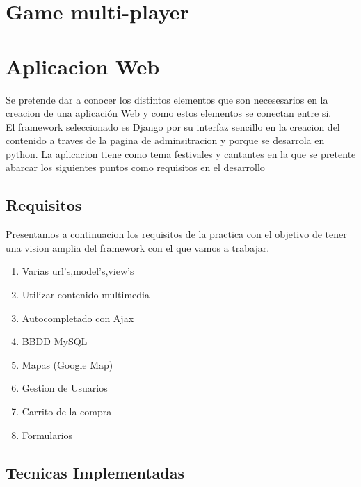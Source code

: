 \section{Game multi-player}
\section{Aplicacion Web}
Se pretende dar a conocer los distintos elementos que son necesesarios en la creacion de una aplicación Web y como estos elementos se conectan entre si.\\El framework seleccionado es Django por su interfaz sencillo en la creacion del contenido  a traves de la pagina de adminsitracion y porque se desarrola en python.
La aplicacion tiene como tema festivales y cantantes  en la que se pretente abarcar los siguientes puntos como requisitos en el desarrollo
\subsection{Requisitos}
Presentamos a continuacion los requisitos de la practica con el objetivo de tener una vision amplia del framework con el que vamos a trabajar.
\begin{enumerate}
\item Varias url's,model's,view's
\item Utilizar contenido multimedia
\item Autocompletado con Ajax
\item BBDD MySQL
\item Mapas (Google Map)
\item Gestion de Usuarios
\item Carrito de la compra
\item Formularios
\end{enumerate}
\subsection{Tecnicas Implementadas}
